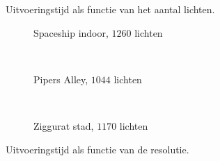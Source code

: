 \begin{figure}[t]
\begin{minipage}[t]{0.5\textwidth}
  \caption{\small Uitvoeringstijd als functie van het aantal lichten.}
  \label{fig:fds-test-lights}
  \end{minipage} %
  \begin{minipage}[t]{0.5\textwidth}
  \begin{adjustbox}{minipage=\textwidth, scale=0.55}
    \begin{subfigure}[b]{1.6\textwidth}
      \centering
      \def\svgwidth{\textwidth}
      
      \caption{Spaceship indoor, $1260$ lichten}
      \vspace{4pt}
      \label{fig:fds-test-resolution:indoor}
    \end{subfigure}
  \end{adjustbox} \\
  \begin{adjustbox}{minipage=\textwidth, scale=0.55}
    \begin{subfigure}[b]{1.6\textwidth}
      \centering
      \def\svgwidth{\textwidth}
      
      \caption{Pipers Alley, $1044$ lichten}
      \vspace{4pt}
      \label{fig:fds-test-resolution:alley}
    \end{subfigure}
  \end{adjustbox} \\
  \begin{adjustbox}{minipage=\textwidth, scale=0.55}
    \begin{subfigure}[b]{1.6\textwidth}
      \centering
      \def\svgwidth{\textwidth}
      
      \caption{Ziggurat stad, $1170$ lichten}
      \label{fig:fds-test-resolution:city}
    \end{subfigure}
  \end{adjustbox}
  \caption{\small Uitvoeringstijd als functie van de resolutie. }
  \label{fig:fds-test-resolution}
  \end{minipage}
\end{figure}

